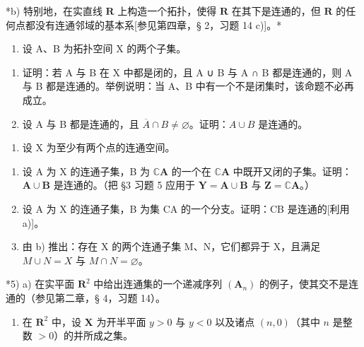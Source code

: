 *b) 特别地，在实直线 \(\mathbf{R}\) 上构造一个拓扑，使得 \(\mathbf{R}\) 在其下是连通的，但 \(\mathbf{R}\) 的任何点都没有连通邻域的基本系{[}参见第四章，§ 2，习题 14 c){]}。*

\begin{enumerate}
\def\labelenumi{\arabic{enumi})}
\setcounter{enumi}{2}
\tightlist
\item
  设 A、B 为拓扑空间 X 的两个子集。
\end{enumerate}

\begin{enumerate}
\def\labelenumi{\alph{enumi})}
\item
  证明：若 A 与 B 在 X 中都是闭的，且 A ∪ B 与 A ∩ B 都是连通的，则 A 与 B 都是连通的。举例说明：当 A、B 中有一个不是闭集时，该命题不必再成立。
\item
  设 A 与 B 都是连通的，且 \(\overline{A} \cap B \neq \varnothing\)。证明：\(A \cup B\) 是连通的。
\end{enumerate}

\begin{enumerate}
\def\labelenumi{\arabic{enumi})}
\setcounter{enumi}{3}
\tightlist
\item
  设 X 为至少有两个点的连通空间。
\end{enumerate}

\begin{enumerate}
\def\labelenumi{\alph{enumi})}
\item
  设 A 为 X 的连通子集，B 为 \(\mathbb{C}\mathbf{A}\) 的一个在 \(\mathbb{C}\mathbf{A}\) 中既开又闭的子集。证明：\(\mathbf{A} \cup \mathbf{B}\) 是连通的。（把 §3 习题 5 应用于 \(\mathbf{Y} = \mathbf{A} \cup \mathbf{B}\) 与 \(\mathbf{Z} = \mathbb{C}\mathbf{A}\)。）
\item
  设 A 为 X 的连通子集，B 为集 CA 的一个分支。证明：CB 是连通的{[}利用 a){]}。
\item
  由 b) 推出：存在 X 的两个连通子集 M、N，它们都异于 X，且满足 \(M \cup N = X\) 与 \(M \cap N = \varnothing\)。
\end{enumerate}

*5) a) 在实平面 \(\mathbf{R}^2\) 中给出连通集的一个递减序列 \((\mathbf{A}_n)\) 的例子，使其交不是连通的（参见第二章，§ 4，习题 14）。

\begin{enumerate}
\def\labelenumi{\alph{enumi})}
\setcounter{enumi}{1}
\tightlist
\item
  在 \(\mathbf{R}^2\) 中，设 \(\mathbf{X}\) 为开半平面 \(y > 0\) 与 \(y < 0\) 以及诸点 \((n, 0)\)（其中 \(n\) 是整数 \(> 0\)）的并所成之集。
\end{enumerate}

